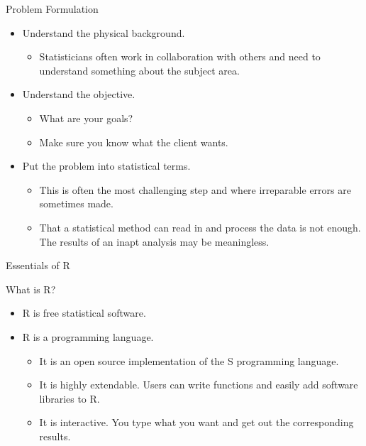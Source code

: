\begin{frame}{Problem Formulation}
\protect\hypertarget{problem-formulation}{}

\begin{itemize}
\tightlist
\item
  Understand the physical background.

  \begin{itemize}
  \tightlist
  \item
    Statisticians often work in collaboration with others and need to
    understand something about the subject area.
  \end{itemize}
\item
  Understand the objective.

  \begin{itemize}
  \tightlist
  \item
    What are your goals?
  \item
    Make sure you know what the client wants.
  \end{itemize}
\item
  Put the problem into statistical terms.

  \begin{itemize}
  \tightlist
  \item
    This is often the most challenging step and where irreparable errors
    are sometimes made.
  \item
    That a statistical method can read in and process the data is not
    enough. The results of an inapt analysis may be meaningless.
  \end{itemize}
\end{itemize}

\end{frame}

\begin{frame}{Essentials of R}
\protect\hypertarget{essentials-of-r}{}

What is R?

\begin{itemize}
\tightlist
\item
  R is free statistical software.
\item
  R is a programming language.

  \begin{itemize}
  \tightlist
  \item
    It is an open source implementation of the S programming language.
  \item
    It is highly extendable. Users can write functions and easily add
    software libraries to R.
  \item
    It is interactive. You type what you want and get out the
    corresponding results.
  \end{itemize}
\end{itemize}

\end{frame}

